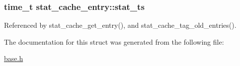 \hypertarget{structstat__cache__entry_a78ae66597db0f86aebfd4f8595057704}{
\subsubsection[{stat\-\_\-ts}]{\setlength{\rightskip}{0pt plus 5cm}time\-\_\-t stat\-\_\-cache\-\_\-entry\-::stat\-\_\-ts}}\label{structstat__cache__entry_a78ae66597db0f86aebfd4f8595057704}


Referenced by stat\-\_\-cache\-\_\-get\-\_\-entry(), and stat\-\_\-cache\-\_\-tag\-\_\-old\-\_\-entries().



The documentation for this struct was generated from the following file\-:\begin{DoxyCompactItemize}
\item 
\hyperlink{base_8h}{base.\-h}\end{DoxyCompactItemize}
